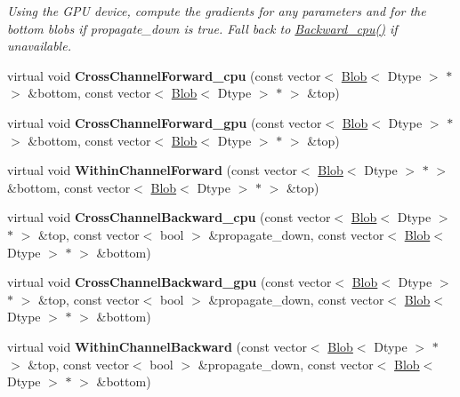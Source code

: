 \begin{DoxyCompactItemize}
\begin{DoxyCompactList}\small\item\em Using the G\+PU device, compute the gradients for any parameters and for the bottom blobs if propagate\+\_\+down is true. Fall back to \hyperlink{classcaffe_1_1LRNLayer_a71ff30a634527e2bf89c067d3c325979}{Backward\+\_\+cpu()} if unavailable. \end{DoxyCompactList}\item 
virtual void {\bfseries Cross\+Channel\+Forward\+\_\+cpu} (const vector$<$ \hyperlink{classcaffe_1_1Blob}{Blob}$<$ Dtype $>$ $\ast$ $>$ \&bottom, const vector$<$ \hyperlink{classcaffe_1_1Blob}{Blob}$<$ Dtype $>$ $\ast$ $>$ \&top)\hypertarget{classcaffe_1_1LRNLayer_a9245d2e182710f0bc7bb637eda6deb65}{}\label{classcaffe_1_1LRNLayer_a9245d2e182710f0bc7bb637eda6deb65}

\item 
virtual void {\bfseries Cross\+Channel\+Forward\+\_\+gpu} (const vector$<$ \hyperlink{classcaffe_1_1Blob}{Blob}$<$ Dtype $>$ $\ast$ $>$ \&bottom, const vector$<$ \hyperlink{classcaffe_1_1Blob}{Blob}$<$ Dtype $>$ $\ast$ $>$ \&top)\hypertarget{classcaffe_1_1LRNLayer_adb64964f9adf8f7fd2f51e079de94e71}{}\label{classcaffe_1_1LRNLayer_adb64964f9adf8f7fd2f51e079de94e71}

\item 
virtual void {\bfseries Within\+Channel\+Forward} (const vector$<$ \hyperlink{classcaffe_1_1Blob}{Blob}$<$ Dtype $>$ $\ast$ $>$ \&bottom, const vector$<$ \hyperlink{classcaffe_1_1Blob}{Blob}$<$ Dtype $>$ $\ast$ $>$ \&top)\hypertarget{classcaffe_1_1LRNLayer_a1ee0b177676121e682bdfa02f9156efe}{}\label{classcaffe_1_1LRNLayer_a1ee0b177676121e682bdfa02f9156efe}

\item 
virtual void {\bfseries Cross\+Channel\+Backward\+\_\+cpu} (const vector$<$ \hyperlink{classcaffe_1_1Blob}{Blob}$<$ Dtype $>$ $\ast$ $>$ \&top, const vector$<$ bool $>$ \&propagate\+\_\+down, const vector$<$ \hyperlink{classcaffe_1_1Blob}{Blob}$<$ Dtype $>$ $\ast$ $>$ \&bottom)\hypertarget{classcaffe_1_1LRNLayer_acf4dbe14f7287924309aefa95cfc3273}{}\label{classcaffe_1_1LRNLayer_acf4dbe14f7287924309aefa95cfc3273}

\item 
virtual void {\bfseries Cross\+Channel\+Backward\+\_\+gpu} (const vector$<$ \hyperlink{classcaffe_1_1Blob}{Blob}$<$ Dtype $>$ $\ast$ $>$ \&top, const vector$<$ bool $>$ \&propagate\+\_\+down, const vector$<$ \hyperlink{classcaffe_1_1Blob}{Blob}$<$ Dtype $>$ $\ast$ $>$ \&bottom)\hypertarget{classcaffe_1_1LRNLayer_af20fe643394acab7d522b5486e7d18af}{}\label{classcaffe_1_1LRNLayer_af20fe643394acab7d522b5486e7d18af}

\item 
virtual void {\bfseries Within\+Channel\+Backward} (const vector$<$ \hyperlink{classcaffe_1_1Blob}{Blob}$<$ Dtype $>$ $\ast$ $>$ \&top, const vector$<$ bool $>$ \&propagate\+\_\+down, const vector$<$ \hyperlink{classcaffe_1_1Blob}{Blob}$<$ Dtype $>$ $\ast$ $>$ \&bottom)\hypertarget{classcaffe_1_1LRNLayer_af2e2a6f5d01e8add2d297b5437f33d49}{}\label{classcaffe_1_1LRNLayer_af2e2a6f5d01e8add2d297b5437f33d49}

\end{DoxyCompactItemize}
